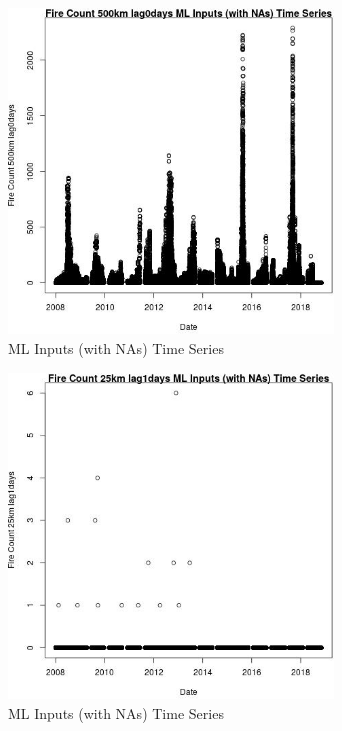 \begin{figure} 
\centering  
\includegraphics[width=0.77\textwidth]{Code_Outputs/Report_ML_input_PM25_Step4_part_e_de_duplicated_aves_compiled_2019-05-20wNAs_Fire_Count_500km_lag0daysvDate.jpg} 
\caption{\label{fig:Report_ML_input_PM25_Step4_part_e_de_duplicated_aves_compiled_2019-05-20wNAsFire_Count_500km_lag0daysvDate}ML Inputs (with NAs) Time Series} 
\end{figure} 
 

\begin{figure} 
\centering  
\includegraphics[width=0.77\textwidth]{Code_Outputs/Report_ML_input_PM25_Step4_part_e_de_duplicated_aves_compiled_2019-05-20wNAs_Fire_Count_25km_lag1daysvDate.jpg} 
\caption{\label{fig:Report_ML_input_PM25_Step4_part_e_de_duplicated_aves_compiled_2019-05-20wNAsFire_Count_25km_lag1daysvDate}ML Inputs (with NAs) Time Series} 
\end{figure} 
 

